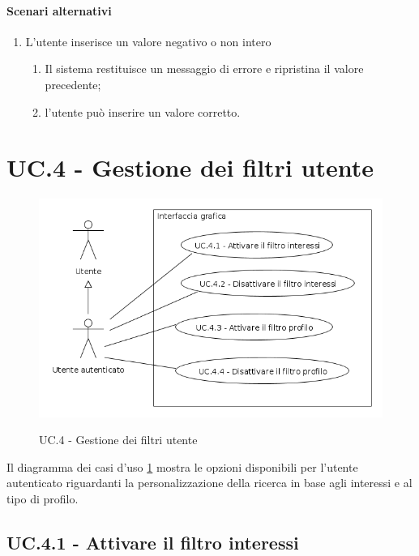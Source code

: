 \documentclass[10pt,a4paper,headinclude,footinclude,hidelinks]{scrreprt} %
\begin{document}
	\paragraph{Scenari alternativi}
	\begin{enumerate}
	\item L'utente inserisce un valore negativo o non intero
		\begin{enumerate}
		\item Il sistema restituisce un messaggio di errore e ripristina il valore precedente;
		\item l'utente può inserire un valore corretto.
		\end{enumerate}
	\end{enumerate}

	\section{UC.4 - Gestione dei filtri utente}
	\label{ch:stage:ar:uc:4}

	\begin{figure}[ht]
		\begin{center}
	    	\includegraphics[width=12cm]{uc_4.png}
			\label{gfx:uc:4}
			\caption{UC.4 - Gestione dei filtri utente}
		\end{center}
	\end{figure}

	Il diagramma dei casi d'uso \ref{gfx:uc:4} mostra le opzioni disponibili per l'utente autenticato riguardanti la personalizzazione della ricerca in base agli interessi e al tipo di profilo.

	\subsection[UC.4.1]{UC.4.1 - Attivare il filtro interessi}
	\label{sec:stage:ar:uc:4_1}
\end{document}
